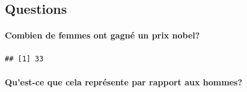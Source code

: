 \documentclass[
]{article}
\newenvironment{Shaded}{\begin{snugshade}}{\end{snugshade}}
\newcommand{\AttributeTok}[1]{\textcolor[rgb]{0.77,0.63,0.00}{#1}}
\newcommand{\CommentTok}[1]{\textcolor[rgb]{0.56,0.35,0.01}{\textit{#1}}}
\newcommand{\FunctionTok}[1]{\textcolor[rgb]{0.00,0.00,0.00}{#1}}
\newcommand{\NormalTok}[1]{#1}
\newcommand{\OtherTok}[1]{\textcolor[rgb]{0.56,0.35,0.01}{#1}}
\newcommand{\SpecialCharTok}[1]{\textcolor[rgb]{0.00,0.00,0.00}{#1}}
\newcommand{\StringTok}[1]{\textcolor[rgb]{0.31,0.60,0.02}{#1}}
\begin{document}
\hypertarget{questions}{%
\subsection{\texorpdfstring{\textbf{Questions}}{Questions}}\label{questions}}

\hypertarget{combien-de-femmes-ont-gagnuxe9-un-prix-nobel}{%
\paragraph{\texorpdfstring{\textbf{Combien de femmes ont gagné un prix
nobel?}}{Combien de femmes ont gagné un prix nobel?}}\label{combien-de-femmes-ont-gagnuxe9-un-prix-nobel}}

\begin{Shaded}
\end{Shaded}

\begin{verbatim}
## [1] 33
\end{verbatim}

\hypertarget{quest-ce-que-cela-repruxe9sente-par-rapport-aux-hommes}{%
\paragraph{\texorpdfstring{\textbf{Qu'est-ce que cela représente par
rapport aux
hommes?}}{Qu'est-ce que cela représente par rapport aux hommes?}}\label{quest-ce-que-cela-repruxe9sente-par-rapport-aux-hommes}}
\end{document}
